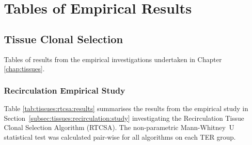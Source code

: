 %
%
\chapter{Tables of Empirical Results}
\label{ch:appendix:results}

%
%
\section{Tissue Clonal Selection}
\label{appendix:results:tissues}
Tables of results from the empirical investigations undertaken in Chapter \ref{chap:tissues}.

%
%
\subsection{Recirculation Empirical Study}
\label{appendix:results:tissues:recirculation}
Table \ref{tab:tissues:rtcsa:results} summarises the results from the empirical study in Section~\ref{subsec:tissues:recirculation:study} investigating the Recirculation Tissue Clonal Selection Algorithm (RTCSA). The non-parametric Mann-Whitney~U statistical test was calculated pair-wise for all algorithms on each TER group. 


